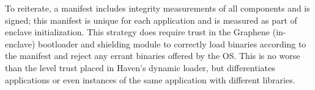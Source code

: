 To reiterate, a manifest includes integrity measurements of all components and is signed; this manifest is unique for each application and is measured as
part of enclave initialization. %
This strategy does require
trust in the Graphene (in-enclave) bootloader and shielding module to correctly load binaries
according to the manifest and reject any errant binaries offered by the OS.  This is no worse than the level trust
placed in Haven's dynamic loader, but differentiates applications or even instances of the same application with different libraries.








\begin{comment}
To summarize,
\graphenesgx{} enforces the integrity of an application loaded into an enclave based on two strategies:
First, the shielding library and the executable to run are verified as part of the cryptographically-measured memory. 
Second, the Linux library OS, the standard C libraries,
and other user libraries are verified against the checksums stored in a manifest,
which is also part of the measured memory.
The measurement is essentially a message authentication code (MAC) of the isolated application,
and a MAC that authenticates checksums generated by a secure hashing algorithm like SHA-256 is equally indistinguishable as a MAC that directly authenticates the checksum'ed binaries.
\end{comment}





